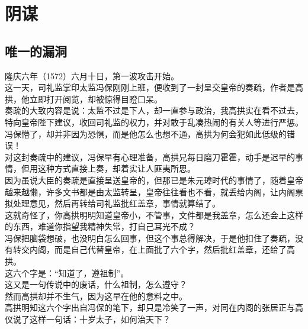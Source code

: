 \section{阴谋}
\ifnum{}
	\begin{multicols}{\theparacolNo}
\fi
\subsection{唯一的漏洞}
隆庆六年（1572）六月十日，第一波攻击开始。\\

这一天，司礼监掌印太监冯保刚刚上班，便收到了一封呈交皇帝的奏疏，作者是高拱，他立即打开阅览，却被惊得目瞪口呆。\\

奏疏的大致内容是说：太监不过是下人，却一直参与政治，我高拱实在看不过去，特向皇帝陛下建议，收回司礼监的权力，并对敢于乱凑热闹的有关人等进行严惩。\\

冯保懵了，却并非因为恐惧，而是他怎么也想不通，高拱为何会犯如此低级的错误！\\

对这封奏疏中的建议，冯保早有心理准备，高拱兄每日磨刀霍霍，动手是迟早的事情，但用这种方式直接上奏，却着实让人匪夷所思。\\

因为虽说大臣的奏疏是直接呈送皇帝的，但那已是朱元璋时代的事情了，随着皇帝越来越懒，许多文书都是由太监转呈，皇帝往往看也不看，就丢给内阁，让内阁票拟处理意见，然后再转给司礼监批红盖章，事情就算结了。\\

这就奇怪了，你高拱明明知道皇帝小，不管事，文件都是我盖章，怎么还会上这样的东西，难道你指望我精神失常，打自己耳光不成？\\

冯保把脑袋想破，也没明白怎么回事，但这个事总得解决，于是他扣住了奏疏，没有转交内阁，而是自己代替皇帝，在上面批了六个字，然后批红盖章，还给了高拱。\\

这六个字是：“知道了，遵祖制”。\\

这又是一句传说中的废话，什么祖制，怎么遵守？\\

然而高拱却并不生气，因为这早在他的意料之中。\\

高拱明知这六个字出自冯保的笔下，却只是冷笑了一声，对同在内阁的张居正与高仪说了这样一句话：十岁太子，如何治天下？\\


\end{multicols}
